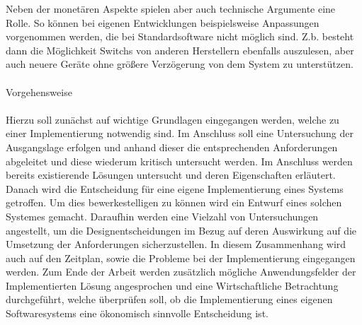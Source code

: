 Neben der monetären Aspekte spielen aber auch technische Argumente eine Rolle.
So können bei eigenen Entwicklungen beispielsweise Anpassungen vorgenommen werden, die bei Standardsoftware nicht möglich sind. Z.b. besteht dann die Möglichkeit Switchs von anderen Herstellern ebenfalls auszulesen, aber auch neuere Geräte ohne größere Verzögerung von dem System zu unterstützen.
\\
\\Vorgehensweise\\
\\
Hierzu soll zunächst auf wichtige Grundlagen eingegangen werden, welche zu einer Implementierung notwendig sind. Im Anschluss soll eine Untersuchung der Ausgangslage erfolgen und anhand dieser die entsprechenden Anforderungen abgeleitet und diese wiederum kritisch untersucht werden. Im Anschluss werden bereits existierende Lösungen untersucht und deren Eigenschaften erläutert. Danach wird die Entscheidung für eine eigene Implementierung eines Systems getroffen. Um dies bewerkestelligen zu können wird ein Entwurf eines solchen Systemes gemacht. Daraufhin werden eine Vielzahl von Untersuchungen angestellt, um die Designentscheidungen im Bezug auf deren Auswirkung auf die Umsetzung der Anforderungen sicherzustellen. In diesem Zusammenhang wird auch auf den Zeitplan, sowie die Probleme bei der Implementierung eingegangen werden.
Zum Ende der Arbeit werden zusätzlich mögliche Anwendungsfelder der Implementierten Lösung angesprochen und eine Wirtschaftliche Betrachtung durchgeführt, welche überprüfen soll, ob die Implementierung eines eigenen Softwaresystems eine ökonomisch sinnvolle Entscheidung ist.\\